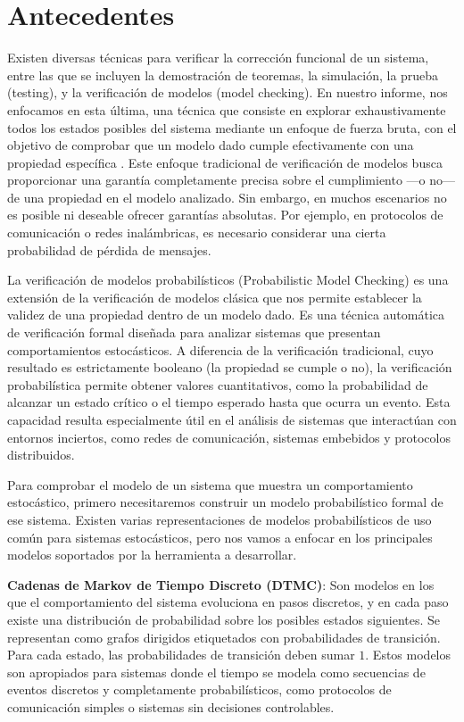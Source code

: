 \documentclass[runningheads]{llncs}
\begin{document}
\section{Antecedentes}

Existen diversas técnicas para verificar la corrección funcional de un sistema, entre las que se incluyen la demostración de teoremas, la simulación, la prueba (testing), y la verificación de modelos (model checking). En nuestro informe, nos enfocamos en esta última, una técnica que consiste en explorar exhaustivamente todos los estados posibles del sistema mediante un enfoque de fuerza bruta, con el objetivo de comprobar que un modelo dado cumple efectivamente con una propiedad específica \cite{BK07}. Este enfoque tradicional de verificación de modelos busca proporcionar una garantía completamente precisa sobre el cumplimiento —o no— de una propiedad en el modelo analizado. Sin embargo, en muchos escenarios no es posible ni deseable ofrecer garantías absolutas. Por ejemplo, en protocolos de comunicación o redes inalámbricas, es necesario considerar una cierta probabilidad de pérdida de mensajes.

La verificación de modelos probabilísticos (Probabilistic Model Checking) es una extensión de la verificación de modelos clásica que nos permite establecer la validez de una propiedad dentro de un modelo dado. Es una técnica automática de verificación formal diseñada para analizar sistemas que presentan comportamientos estocásticos.
A diferencia de la verificación tradicional, cuyo resultado es estrictamente booleano (la propiedad se cumple o no), la verificación probabilística permite obtener valores cuantitativos, como la probabilidad de alcanzar un estado crítico o el tiempo esperado hasta que ocurra un evento. Esta capacidad resulta especialmente útil en el análisis de sistemas que interactúan con entornos inciertos, como redes de comunicación, sistemas embebidos y protocolos distribuidos.

Para comprobar el modelo de un sistema que muestra un comportamiento estocástico, primero necesitaremos construir un modelo probabilístico formal de ese sistema. Existen varias representaciones de modelos probabilísticos de uso común para sistemas estocásticos, pero nos vamos a enfocar en los principales modelos soportados por la herramienta a desarrollar.

\textbf{Cadenas de Markov de Tiempo Discreto (DTMC)}: Son modelos en los que el comportamiento del sistema evoluciona en pasos discretos, y en cada paso existe una distribución de probabilidad sobre los posibles estados siguientes. Se representan como grafos dirigidos etiquetados con probabilidades de transición. Para cada estado, las probabilidades de transición deben sumar $1$\cite{KNP02}. Estos modelos son apropiados para sistemas donde el tiempo se modela como secuencias de eventos discretos y completamente probabilísticos, como protocolos de comunicación simples o sistemas sin decisiones controlables.
\end{document}
